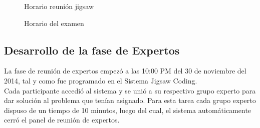 \begin{figure}
	\centering
	\caption{Horario reunión jigsaw}
	\label{fig:c5_horario_reunion_jigsaw}
\end{figure}

\begin{figure}
	\centering
	\caption{Horario del examen}
	\label{fig:c5_horario_examen}
\end{figure}

\subsection{Desarrollo de la fase de Expertos}
La fase de reunión de expertos empezó a las 10:00 PM del 30 de noviembre del 2014, tal y como fue programado en el Sistema Jigsaw Coding.\\

Cada participante accedió al sistema y se unió a su respectivo grupo experto para dar solución al problema que tenían asignado. Para esta tarea cada grupo experto dispuso de un tiempo de 10 minutos, luego del cual, el sistema automáticamente cerró el panel de reunión de expertos.\\

